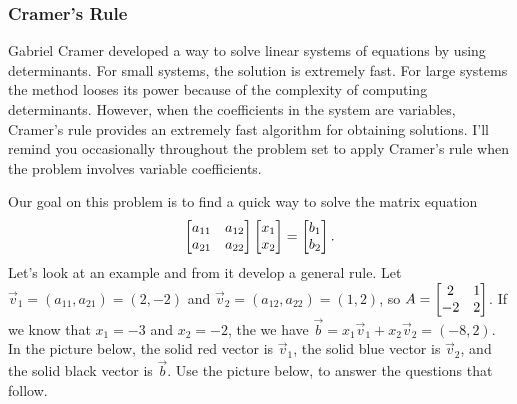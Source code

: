 \mysubsection{\idealin}


\subsubsection*{Cramer's Rule}
Gabriel Cramer developed a way to solve linear systems of equations by using determinants. For small systems, the solution is extremely fast.  For large systems the method looses its power because of the complexity of computing determinants.  However, when the coefficients in the system are variables, Cramer's rule provides an extremely fast algorithm for obtaining solutions. I'll remind you occasionally throughout the problem set to apply Cramer's rule when the problem involves variable coefficients.
\begin{problem}
Our goal on this problem is to find a quick way to solve the matrix equation $$\begin{bmatrix}\begin{matrix} a_{11}\\a_{21} \end{matrix}&\begin{matrix} a_{12}\\a_{22} \end{matrix} \end{bmatrix}
\begin{bmatrix}\begin{matrix} x_{1}\\x_{2} \end{matrix} \end{bmatrix}
=
\begin{bmatrix}\begin{matrix} b_{1}\\b_{2} \end{matrix} \end{bmatrix}.$$ 
Let's look at an example and from it develop a general rule. 
Let $\vec v_1 = (a_{11},a_{21})=(2,-2)$ and $\vec v_2 = (a_{12},a_{22})= (1,2)$, so $A=\begin{bmatrix} 2&1\\-2&2 \end{bmatrix}$. If we know that $x_1=-3$ and $x_2 = -2$, the we have $\vec b = x_1\vec v_1+x_2\vec v_2=(-8,2)$. In the picture below, the solid red vector is $\vec v_1$, the solid blue vector is $\vec v_2$, and the solid black vector is $\vec b$. Use the picture below, to answer the questions that follow.



\end{problem}
